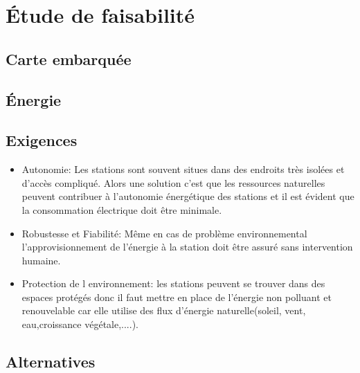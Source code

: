 \section{Étude de faisabilité}

\subsection{Carte embarquée}

\subsection{Énergie}

\subsection{Exigences}
\begin{itemize}

\item Autonomie: Les stations sont souvent situes dans des endroits tr\`es isol\'{e}es et d'acc\`es compliqu\'e. Alors une solution c'est que les ressources naturelles peuvent contribuer  à l'autonomie \'energ\'{e}tique des stations et il est \'{e}vident que la consommation \'{e}lectrique doit \^etre minimale.

\smallskip \item Robustesse et Fiabilit\'{e}: Même en cas de probl\`eme environnemental l'approvisionnement de l'\'{e}nergie \`a la station doit \^etre assur\'{e} sans intervention humaine.

\smallskip \item Protection de l environnement: les stations peuvent se trouver dans des espaces prot\'{e}g\'{e}s donc il faut mettre en place de l'\'{e}nergie non polluant et renouvelable car elle utilise des flux d'\'{e}nergie naturelle(soleil, vent, eau,croissance v\'{e}g\'{e}tale,....).
\end{itemize}

\subsection{Alternatives}

